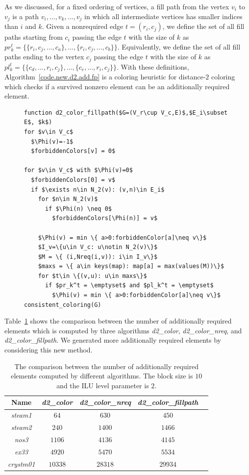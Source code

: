 \documentclass[12pt, twoside,a4paper,toc=bibliography]{scrbook}
\newcommand{\coderef}[1]{Algorithm~\protect\ref{#1}}
\begin{document}
As we discussed, for a fixed ordering of vertices,
a fill path from the vertex $v_i$ to $v_j$ is a path $v_i,...,v_k,...,v_j$
in which all intermediate vertices has smaller indices than $i$ and $k$.
Given a nonrequired edge $t=(r_i,c_j)$, we define the set of all fill paths starting
from $c_i$ passing the edge $t$ with the size of $k$ as
$pr_k^t = \{\{ r_i,c_j,...,c_a\},...,\{ r_i,c_j,...,c_b\}\}$.
Equivalently, we define the set of all fill paths ending to the vertex $c_j$
passing the edge $t$ with the size of $k$ as
$pl_k^t = \{ \{c_d,...,r_i,c_j\},..., \{c_e,...,r_i,c_j\}\}$.
With these definitions, \coderef{code.new.d2.add.fp} is a coloring heuristic
for distance-$2$ coloring which checks if a survived nonzero element can be an
additionally required element.
\begin{figure}
\begin{lstlisting}[caption=New coloring heuristic for distance-$2$ coloring
predicting if a survived nonrequired elements can be an additionally required element.,
label=code.new.d2.add.fp,mathescape]
function d2_color_fillpath($G=(V_r\cup V_c,E)$,$E_i\subset E$, $k$)
for $v\in V_c$
  $\Phi(v)=-1$
  $forbiddenColors[v] = 0$

for $v\in V_c$ with $\Phi(v)=0$
  $forbiddenColors[0] = v$
  if $\exists n\in N_2(v): (v,n)\in E_i$
    for $n\in N_2(v)$
      if $\Phi(n) \neq 0$
        $forbiddenColors[\Phi(n)] = v$

    $\Phi(v) = min \{ a>0:forbiddenColor[a]\neq v\}$
    $I_v=\{u\in V_c: u\notin N_2(v)\}$
    $M = \{ (i,Nreq(i,v)): i\in I_v\}$
    $maxs = \{ a\in keys(map): map[a] = max(values(M))\}$
    for $t\in \{(v,u): u\in maxs\}$
      if $pr_k^t = \emptyset$ and $pl_k^t = \emptyset$
        $\Phi(v) = min \{ a>0:forbiddenColor[a]\neq v\}$
consistent_coloring(G)
\end{lstlisting}
\end{figure}
Table~\ref{mats.add.gr.vs.nreq.vs.fillpath} shows the comparison between the number of additionally required elements
which is computed by three algorithms \textit{d2\_color},
 \textit{d2\_color\_nreq}, and \textit{d2\_color\_fillpath}. We generated more additionally required elements
by considering this new method.
\begin{table}
\centering
\begin{tabular}{|c|c|c|c|c|}
\hline
Name & \textit{d2\_color}& \textit{d2\_color\_nreq} & \textit{d2\_color\_fillpath}\\\hline
\textit{steam1} & $64$ & $630$ & $450$ \\\hline
\textit{steam2} & $240$ & $1400$ & $1466$ \\\hline
\textit{nos3} & $1106$ & $4136$ & $4145$\\\hline
\textit{ex33} & $4920$ & $5470$ & $5534$\\\hline
\textit{crystm01} & $10338$ & $28318$ & $29934$\\\hline
\end{tabular}
\caption{The comparison between the number of additionally required
elements computed by different algorithms.
The block size is $10$ and the ILU level parameter is $2$.}
\label{mats.add.gr.vs.nreq.vs.fillpath}
\end{table}
\end{document}
